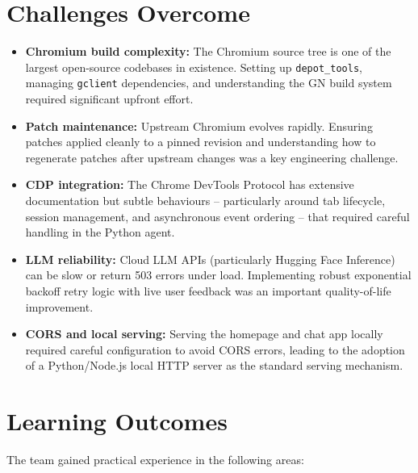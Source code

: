 \section{Challenges Overcome}
\begin{itemize}[leftmargin=*]
    \item \textbf{Chromium build complexity:} The Chromium source tree is one of the largest open-source codebases in existence. Setting up \texttt{depot\_tools}, managing \texttt{gclient} dependencies, and understanding the GN build system required significant upfront effort.
    \item \textbf{Patch maintenance:} Upstream Chromium evolves rapidly. Ensuring patches applied cleanly to a pinned revision and understanding how to regenerate patches after upstream changes was a key engineering challenge.
    \item \textbf{CDP integration:} The Chrome DevTools Protocol has extensive documentation but subtle behaviours -- particularly around tab lifecycle, session management, and asynchronous event ordering -- that required careful handling in the Python agent.
    \item \textbf{LLM reliability:} Cloud LLM APIs (particularly Hugging Face Inference) can be slow or return 503 errors under load. Implementing robust exponential backoff retry logic with live user feedback was an important quality-of-life improvement.
    \item \textbf{CORS and local serving:} Serving the homepage and chat app locally required careful configuration to avoid CORS errors, leading to the adoption of a Python/Node.js local HTTP server as the standard serving mechanism.
\end{itemize}

\needspace{10cm}
\section{Learning Outcomes}
The team gained practical experience in the following areas:

